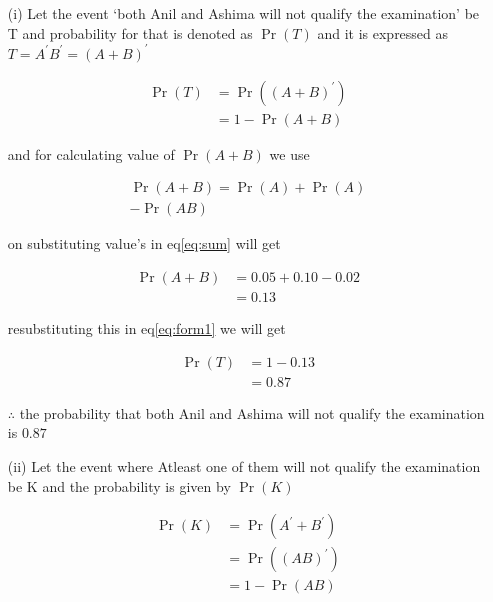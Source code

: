\documentclass[journal,12pt,twocolumn]{IEEEtran}
\providecommand{\brak}[1]{\ensuremath{\left(#1\right)}}
\providecommand{\pr}[1]{\ensuremath{\Pr\left(#1\right)}}
\begin{document}
\begin{enumerate}




     \item[(i)] Let the event ‘both Anil and Ashima will not qualify the examination’ be T and probability for that is denoted as $\pr{T}$ and it is expressed as $T = A^{\prime}B^{\prime} =  \brak{A+B}^{\prime}$

          \begin{align}
              \pr{T} &=  \pr{\brak{A+B}^{\prime}}  \\
              \label{eq:form1}
                     &= 1 - \pr{A+B}
          \end{align} 
    
     and for calculating value of $\pr{A+B}$ we use
    
          \begin{multline}
                \label{eq:sum}
                      \pr{A+B} = \pr{A} + \pr{A} \\
                      - \pr{A B}
          \end{multline}
    
    on substituting value's in eq\eqref{eq:sum} will get
    
          \begin{align}
                \pr{A+B}  &=  0.05 + 0.10 - 0.02 \\
                          &=  0.13
          \end{align}
    
    resubstituting this in eq\eqref{eq:form1} we will get
    
          \begin{align}
                \pr{T} &= 1 - 0.13 \\
                       &= 0.87  
          \end{align} 
    
    $\therefore$ the probability that both Anil and Ashima will not qualify the examination is $0.87$
     
     
     
     
     \item[(ii)] Let the event where Atleast one of them will not qualify the examination be K and the probability is given by $\pr{K}$
     
          \begin{align}
                \pr{K} &= \pr{A^{\prime}+B^{\prime}} \\
                       &= \pr{\brak{A B}^{\prime}} \\
                       &= 1 - \pr{A B}
          \end{align}
    

\end{enumerate}
\end{document}
